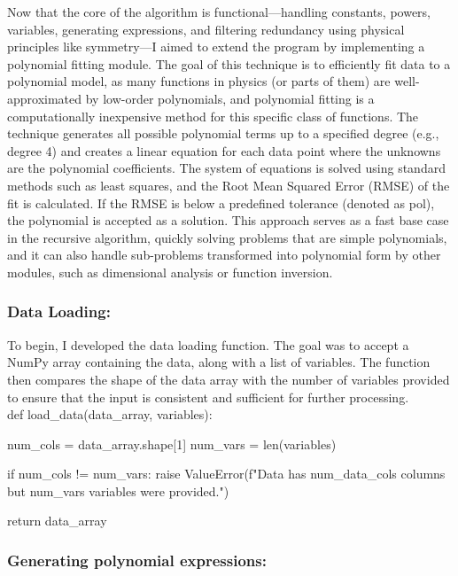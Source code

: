 \documentclass{article}
\begin{document}
Now that the core of the algorithm is functional—handling constants, powers, variables, generating expressions, and filtering redundancy using physical principles like symmetry—I aimed to extend the program by implementing a polynomial fitting module. The goal of this technique is to efficiently fit data to a polynomial model, as many functions in physics (or parts of them) are well-approximated by low-order polynomials, and polynomial fitting is a computationally inexpensive method for this specific class of functions. The technique generates all possible polynomial terms up to a specified degree (e.g., degree 4) and creates a linear equation for each data point where the unknowns are the polynomial coefficients. The system of equations is solved using standard methods such as least squares, and the Root Mean Squared Error (RMSE) of the fit is calculated. If the RMSE is below a predefined tolerance (denoted as pol), the polynomial is accepted as a solution. This approach serves as a fast base case in the recursive algorithm, quickly solving problems that are simple polynomials, and it can also handle sub-problems transformed into polynomial form by other modules, such as dimensional analysis or function inversion.\\


\subsubsection{Data Loading:}

To begin, I developed the data loading function. The goal was to accept a NumPy array containing the data, along with a list of variables. The function then compares the shape of the data array with the number of variables provided to ensure that the input is consistent and sufficient for further processing.\\


def load_data(data_array, variables):

    num_cols = data_array.shape[1]
    num_vars = len(variables)

    if num_cols != num_vars:
        raise ValueError(f"Data has {num_data_cols} columns but {num_vars} variables were provided.")

    return data_array




\subsubsection{Generating polynomial expressions:}
\end{document}
